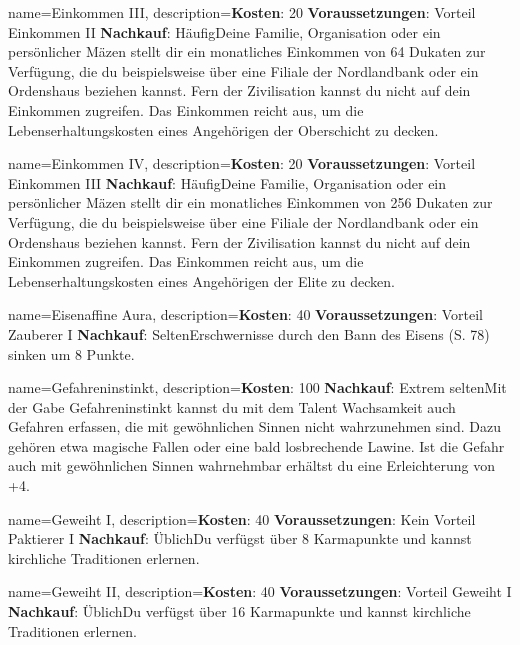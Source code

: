 {
    name={Einkommen III},
    description={\textbf{Kosten}: 20 \textbf{Voraussetzungen}: Vorteil Einkommen II \textbf{Nachkauf}: Häufig\newline Deine Familie, Organisation oder ein persönlicher Mäzen stellt dir ein monatliches Einkommen von 64 Dukaten zur Verfügung, die du beispielsweise über eine Filiale der Nordlandbank oder ein Ordenshaus beziehen kannst. Fern der Zivilisation kannst du nicht auf dein Einkommen zugreifen. Das Einkommen reicht aus, um die Lebenserhaltungskosten eines Angehörigen der Oberschicht zu decken.}
}


{
    name={Einkommen IV},
    description={\textbf{Kosten}: 20 \textbf{Voraussetzungen}: Vorteil Einkommen III \textbf{Nachkauf}: Häufig\newline Deine Familie, Organisation oder ein persönlicher Mäzen stellt dir ein monatliches Einkommen von 256 Dukaten zur Verfügung, die du beispielsweise über eine Filiale der Nordlandbank oder ein Ordenshaus beziehen kannst. Fern der Zivilisation kannst du nicht auf dein Einkommen zugreifen. Das Einkommen reicht aus, um die Lebenserhaltungskosten eines Angehörigen der Elite zu decken.}
}


{
    name={Eisenaffine Aura},
    description={\textbf{Kosten}: 40 \textbf{Voraussetzungen}: Vorteil Zauberer I \textbf{Nachkauf}: Selten\newline Erschwernisse durch den Bann des Eisens (S. 78) sinken um 8 Punkte.}
}


{
    name={Gefahreninstinkt},
    description={\textbf{Kosten}: 100 \textbf{Nachkauf}: Extrem selten\newline Mit der Gabe Gefahreninstinkt kannst du mit dem Talent Wachsamkeit auch Gefahren erfassen, die mit gewöhnlichen Sinnen nicht wahrzunehmen sind. Dazu gehören etwa magische Fallen oder eine bald losbrechende Lawine. Ist die Gefahr auch mit gewöhnlichen Sinnen wahrnehmbar erhältst du eine Erleichterung von +4.}
}


{
    name={Geweiht I},
    description={\textbf{Kosten}: 40 \textbf{Voraussetzungen}: Kein Vorteil Paktierer I \textbf{Nachkauf}: Üblich\newline Du verfügst über 8 Karmapunkte und kannst kirchliche Traditionen erlernen.}
}


{
    name={Geweiht II},
    description={\textbf{Kosten}: 40 \textbf{Voraussetzungen}: Vorteil Geweiht I \textbf{Nachkauf}: Üblich\newline Du verfügst über 16 Karmapunkte und kannst kirchliche Traditionen erlernen.}
}



